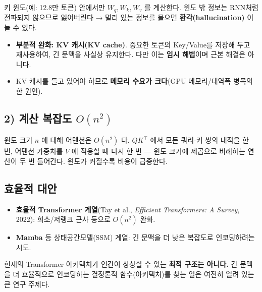 \documentclass[
  korean,
]{article}
\providecommand{\tightlist}{%
  \setlength{\itemsep}{0pt}\setlength{\parskip}{0pt}}
\begin{document}
키 윈도(예: 12.8만 토큰) 안에서만 \(W_q, W_k, W_v\) 를 계산한다. 윈도 밖
정보는 RNN처럼 전파되지 않으므로 잃어버린다 → 멀리 있는 정보를 물으면
\textbf{환각(hallucination)} 이 늘 수 있다.

\begin{itemize}
\tightlist
\item
  \textbf{부분적 완화: KV 캐시(KV cache)}. 중요한 토큰의 Key/Value를
  저장해 두고 재사용하여, 긴 문맥을 사실상 유지한다. 다만 이는
  \textbf{임시 해법}이며 근본 해결은 아니다.
\item
  KV 캐시를 들고 있어야 하므로 \textbf{메모리 수요가 크다}(GPU
  메모리/대역폭 병목의 한 원인).
\end{itemize}

\subsection{\texorpdfstring{2) 계산 복잡도
\(O(n^2)\)}{2) 계산 복잡도 O(n\^{}2)}}\label{uxacc4uxc0b0-uxbcf5uxc7a1uxb3c4-on2}

윈도 크기 \(n\) 에 대해 어텐션은 \(O(n^2)\) 다. \(QK^\top\) 에서 모든
쿼리-키 쌍의 내적을 한 번, 어텐션 가중치를 \(V\) 에 적용할 때 다시 한 번
--- 윈도 크기에 제곱으로 비례하는 연산이 두 번 들어간다. 윈도가 커질수록
비용이 급증한다.

\subsection{효율적 대안}\label{uxd6a8uxc728uxc801-uxb300uxc548}

\begin{itemize}
\tightlist
\item
  \textbf{효율적 Transformer 계열}(Tay et al., \emph{Efficient
  Transformers: A Survey}, 2022): 희소/저랭크 근사 등으로 \(O(n^2)\)
  완화.
\item
  \textbf{Mamba} 등 상태공간모델(SSM) 계열: 긴 문맥을 더 낮은 복잡도로
  인코딩하려는 시도.
\end{itemize}

\begin{tcolorbox}[enhanced jigsaw, arc=.35mm, bottomrule=.15mm, bottomtitle=1mm, breakable, colback=white, colbacktitle=quarto-callout-tip-color!10!white, colframe=quarto-callout-tip-color-frame, coltitle=black, left=2mm, leftrule=.75mm, opacityback=0, opacitybacktitle=0.6, rightrule=.15mm, title=\textcolor{quarto-callout-tip-color}{\faLightbulb}\hspace{0.5em}{열린 문제}, titlerule=0mm, toprule=.15mm, toptitle=1mm]

현재의 Transformer 아키텍처가 인간이 상상할 수 있는 \textbf{최적 구조는
아니다.} 긴 문맥을 더 효율적으로 인코딩하는 결정론적 함수(아키텍처)를
찾는 일은 여전히 열려 있는 큰 연구 주제다.

\end{tcolorbox}
\end{document}
